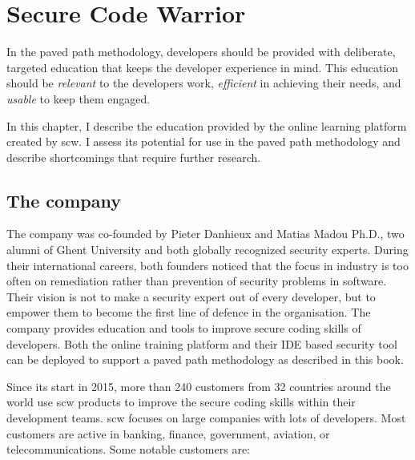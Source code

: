 \chapter{Secure Code Warrior}
\label{ch:scw}
\glsresetall

In the paved path methodology, developers should be provided with deliberate, targeted education that keeps the developer experience in mind.
This education should be \textit{relevant} to the developers work, \textit{efficient} in achieving their needs, and \textit{usable} to keep them engaged.

In this chapter, I describe the education provided by the online learning platform created by \gls{scw}. 
I assess its potential for use in the paved path methodology and describe shortcomings that require further research.


\clearpage

\section{The company}
The company was co-founded by Pieter Danhieux and Matias Madou Ph.D., two alumni of Ghent University and both globally recognized security experts.
During their international careers, both founders noticed that the focus in industry is too often on remediation rather than prevention of \glspl{security problem} in software.
Their vision is not to make a security expert out of every developer, but to empower them to become the first line of defence in the organisation.
The company provides education and tools to improve secure coding skills of developers.
Both the online training platform and their IDE based security tool can be deployed to support a paved path methodology as described in this book.

Since its start in 2015, more than 240 customers from 32 countries around the world use \gls{scw} products to improve the secure coding skills within their development teams.
\Gls{scw} focuses on large companies with lots of developers. Most customers are active in banking, finance, government, aviation, or telecommunications. Some notable customers are:

